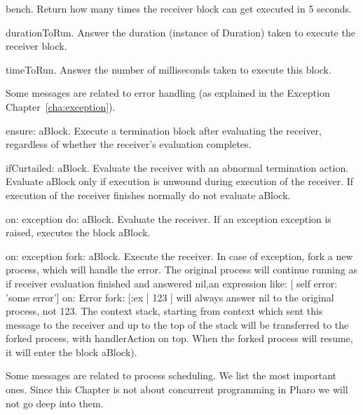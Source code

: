 \documentclass[a4paper,10pt,twoside]{book}
\begin{document}
\begin{description}
\item{\textsf{bench}}. Return how many times the receiver block can get executed in 5 seconds.

\item{\textsf{durationToRun}}. Answer the duration (instance of Duration) taken to execute the receiver block.

\item{\textsf{timeToRun}}. Answer the number of milliseconds taken to execute this block.
\end{description}


Some messages are related to error handling (as explained in the Exception Chapter~\ref{cha:exception}).

\begin{description}
\item{\textsf{ensure: aBlock}}. Execute a termination block  after evaluating the receiver, regardless of whether the receiver's evaluation completes.
\item{\textsf{ifCurtailed: aBlock}}. Evaluate the receiver with an abnormal termination action. Evaluate aBlock only if execution is unwound during execution of the receiver. If execution of the receiver finishes normally do not evaluate aBlock. 

\item{\textsf{on: exception do: aBlock}}. Evaluate the receiver. If an exception \textsf{exception} is raised, executes the block \textsf{aBlock}.

\item{\textsf{on: exception fork: aBlock}}. Execute the receiver. In case of exception, fork a new process, which will handle the error. The original process will continue running as if receiver evaluation finished and answered nil,\ie  an expression like: \textsf{[ self error: 'some error'] on: Error fork: [:ex |  123 ]} will always answer nil to the original process, not 123. The context stack, starting from context which sent this message to the receiver and up to the top of the stack will be transferred to the forked process, with handlerAction on top. When the forked process will resume, it will enter the block \textsf{aBlock}).
\end{description}


Some messages are related to process scheduling. We list the most important ones. Since this Chapter is not about concurrent programming in Pharo we will not go deep into them.
\end{document}
